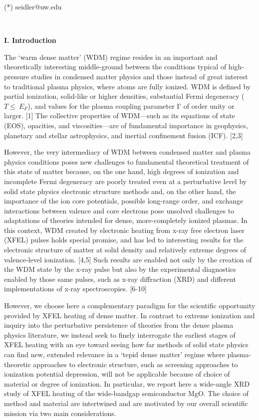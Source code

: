 (*) seidler@uw.edu

\textbf{\\}

\textbf{I. Introduction}

The `warm dense matter' (WDM) regime resides in an important and
theoretically interesting middle-ground between the conditions typical
of high-pressure studies in condensed matter physics and those instead
of great interest to traditional plasma physics, where atoms are fully
ionized. WDM is defined by partial ionization, solid-like or higher
densities, substantial Fermi degeneracy (\(T \leq \ E_{F}\)), and values
for the plasma coupling parameter Γ of order unity or larger. {[}1{]}
The collective properties of WDM---such as its equations of state (EOS),
opacities, and viscosities---are of fundamental importance in
geophysics, planetary and stellar astrophysics, and inertial confinement
fusion (ICF). {[}2,3{]}

However, the very intermediacy of WDM between condensed matter and
plasma physics conditions poses new challenges to fundamental
theoretical treatment of this state of matter because, on the one hand,
high degrees of ionization and incomplete Fermi degeneracy are poorly
treated even at a perturbative level by solid state physics electronic
structure methods and, on the other hand, the importance of the ion core
potentials, possible long-range order, and exchange interactions between
valence and core electrons pose unsolved challenges to adaptations of
theories intended for dense, more-completely ionized plasmas. In this
context, WDM created by electronic heating from x-ray free electron
laser (XFEL) pulses holds special promise, and has led to interesting
results for the electronic structure of matter at solid density and
relatively extreme degrees of valence-level ionization. {[}4,5{]} Such
results are enabled not only by the creation of the WDM state by the
x-ray pulse but also by the experimental diagnostics enabled by those
same pulses, such as x-ray diffraction (XRD) and different
implementations of x-ray spectroscopies. {[}6-10{]}

However, we choose here a complementary paradigm for the scientific
opportunity provided by XFEL heating of dense matter. In contrast to
extreme ionization and inquiry into the perturbative persistence of
theories from the dense plasma physics literature, we instead seek to
finely interrogate the earliest stages of XFEL heating with an eye
toward seeing how far methods of solid state physics can find new,
extended relevance in a `tepid dense matter' regime where
plasma-theoretic approaches to electronic structure, such as screening
approaches to ionization potential depression, will not be applicable
because of choice of material or degree of ionization. In particular, we
report here a wide-angle XRD study of XFEL heating of the wide-bandgap
semiconductor MgO. The choice of method and material are intertwined and
are motivated by our overall scientific mission via two main
considerations.

